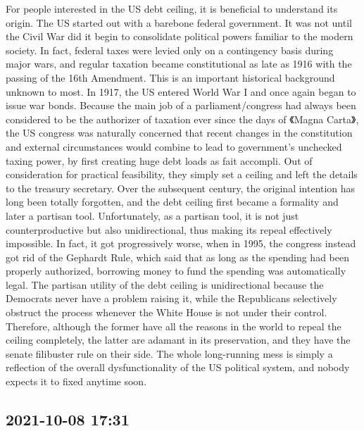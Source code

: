\documentclass[twocolumn]{ctexart}
\begin{document}
For people interested in the US debt ceiling, it is beneficial to understand its origin. The US started out with a barebone federal government. It was not until the Civil War did it begin to consolidate political powers familiar to the modern society. In fact, federal taxes were levied only on a contingency basis during major wars, and regular taxation became constitutional as late as 1916 with the passing of the 16th Amendment. This is an important historical background unknown to most.
In 1917, the US entered World War I and once again began to issue war bonds. Because the main job of a parliament/congress had always been considered to be the authorizer of taxation ever since the days of 《Magna Carta》, the US congress was naturally concerned that recent changes in the constitution and external circumstances would combine to lead to government's unchecked taxing power, by first creating huge debt loads as fait accompli. Out of consideration for practical feasibility, they simply set a ceiling and left the details to the treasury secretary.
Over the subsequent century, the original intention has long been totally forgotten, and the debt ceiling first became a formality and later a partisan tool. Unfortunately, as a partisan tool, it is not just counterproductive but also unidirectional, thus making its repeal effectively impossible. In fact, it got progressively worse, when in 1995, the congress instead got rid of the Gephardt Rule, which said that as long as the spending had been properly authorized, borrowing money to fund the spending was automatically legal.
The partisan utility of the debt ceiling is unidirectional because the Democrats never have a problem raising it, while the Republicans selectively obstruct the process whenever the White House is not under their control. Therefore, although the former have all the reasons in the world to repeal the ceiling completely, the latter are adamant in its preservation, and they have the senate filibuster rule on their side. The whole long-running mess is simply a reflection of the overall dysfunctionality of the US political system, and nobody expects it to fixed anytime soon.
\subsection*{2021-10-08 17:31}
\end{document}

